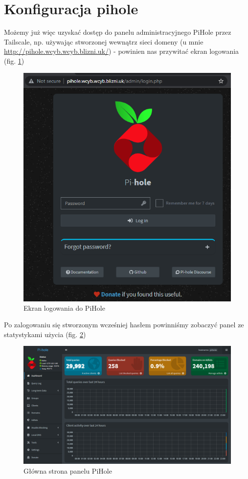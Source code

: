 \documentclass[../main.tex]{subfiles}
\begin{document}
\section{Konfiguracja pihole}
Możemy już więc uzyskać dostęp do panelu administracyjnego PiHole przez Tailscale, np. używając stworzonej wewnątrz sieci domeny (u mnie \url{http://pihole.wcyb.wcyb.blizni.uk/}) - powinien nas przywitać ekran logowania (fig. \ref{fig:pihole_login})
\begin{figure}[H]
    \centering
    \includegraphics[scale=0.75]{pihole-login.png}
    \caption{Ekran logowania do PiHole}
    \label{fig:pihole_login}
\end{figure}
Po zalogowaniu się stworzonym wcześniej hasłem powinniśmy zobaczyć panel ze statystykami użycia (fig. \ref{fig:pihole_dashboard})
\begin{figure}[H]
    \centering
    \includegraphics[scale=0.5]{pihole-dashboard.png}
    \caption{Główna strona panelu PiHole}
    \label{fig:pihole_dashboard}
\end{figure}
\end{document}
